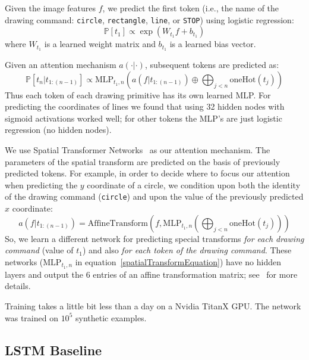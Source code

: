 \documentclass{article}
\newcommand{\probability}{\mathds{P}} %
\begin{document}
Given the image features $f$, we predict the first token (i.e., the name of the drawing command: \verb|circle|, \verb|rectangle|, \verb|line|, or \verb|STOP|) using logistic regression:
\begin{equation}
  \probability [t_1]\propto \exp\left( W_{t_1}f + b_{t_1}\right)
\end{equation}
where $W_{t_1}$ is a learned weight matrix and  $b_{t_1}$ is a learned bias vector.

Given an attention mechanism $a(\cdot | \cdot)$, subsequent tokens are predicted as:
\begin{equation}
  \probability [t_n|t_{1:(n - 1)}]\propto \text{MLP}_{t_1,n}(a(f|t_{1:(n - 1)}) \oplus \bigoplus_{j < n} \text{oneHot}(t_j))\label{discreteTokenPrediction}
\end{equation}
Thus each token of each drawing primitive has its own learned MLP.
For predicting the coordinates of lines we found that using 32 hidden nodes with sigmoid activations worked well;
for other tokens the MLP's are just logistic regression (no hidden nodes).

We use Spatial Transformer Networks~\cite{jaderberg2015spatial}
as our attention mechanism.
The parameters of the spatial transform are predicted on the basis of previously predicted tokens.
For example, in order to decide where to focus our attention when predicting the $y$ coordinate of a circle,
we condition upon both the identity of the drawing command (\verb|circle|) and upon the value of the previously predicted $x$ coordinate:
\begin{equation}
  a(f|t_{1:(n - 1)}) = \text{AffineTransform}(f, \text{MLP}_{t_1,n}(\bigoplus_{j < n}\text{oneHot}(t_j)))
  \label{spatialTransformEquation}
\end{equation}
So, we learn a different network for predicting special transforms
\emph{for each drawing command} (value of $t_1$) and also \emph{for each token of the drawing command}.
These networks ($\text{MLP}_{t_1,n}$ in equation~\ref{spatialTransformEquation}) have no hidden layers and
output the 6 entries of an affine transformation matrix; see~\cite{jaderberg2015spatial}
for more details.

Training takes a little bit less than a day on a Nvidia TitanX GPU.
The network was trained on $10^5$ synthetic examples.
\subsection{LSTM Baseline}
\end{document}

